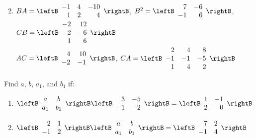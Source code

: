 \begin{multicols}{2}
\begin{ex}
\begin{enumerate}[label={\alph*.}]
\end{enumerate}
\begin{sol}
\begin{enumerate}[label={\alph*.}]
\setcounter{enumi}{1}
\item
$
BA = \leftB \begin{array}{rrr}
-1 & 4 & -10 \\
1 & 2 & 4
\end{array} \rightB$, $B^{2} = \leftB \begin{array}{rr}
7 & -6 \\
-1 & 6
\end{array} \rightB$, $CB = \leftB \begin{array}{rr}
-2 & 12 \\
2 & -6 \\
1 & 6
\end{array} \rightB$ \\
$AC = \leftB \begin{array}{rr}
4 & 10 \\
-2 & -1
\end{array} \rightB$, $CA = \leftB \begin{array}{rrr}
2 & 4 & 8 \\
-1 & -1 & -5 \\
1 & 4 & 2
\end{array} \rightB
$

\end{enumerate}
\end{sol}
\end{ex}


\begin{ex}
Find $a$, $b$, $a_{1}$, and $b_{1}$ if:


\begin{enumerate}[label={\alph*.}]
\item
$\leftB \begin{array}{cc}
a & b \\
a_{1} & b_{1}
\end{array} \rightB \leftB \begin{array}{rr}
3 & -5 \\
-1 & 2
\end{array} \rightB = \leftB \begin{array}{rr}
1 & -1 \\
2 & 0
\end{array} \rightB
$

\item 
$\leftB \begin{array}{rr}
2 & 1 \\
-1 & 2
\end{array} \rightB \leftB \begin{array}{cc}
a & b \\
a_{1} & b_{1}
\end{array} \rightB = \leftB \begin{array}{rr}
7 & 2 \\
-1 & 4
\end{array} \rightB
$


\end{enumerate}
\end{ex}
\end{multicols}
